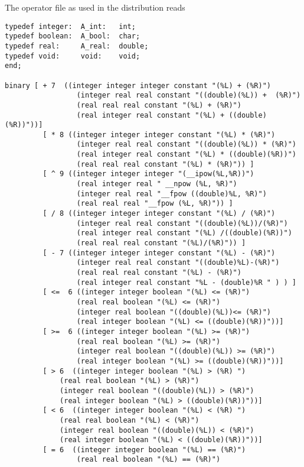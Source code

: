 \documentclass[11pt]{article}
\begin{document}
The operator file as used in the distribution reads
{\footnotesize
\begin{verbatim}
typedef integer:  A_int:   int;
typedef boolean:  A_bool:  char;
typedef real:     A_real:  double;
typedef void:     void:    void;
end;

binary [ + 7  ((integer integer integer constant "(%L) + (%R)")
                 (integer real real constant "((double)(%L)) +  (%R)")
                 (real real real constant "(%L) + (%R)")
                 (real integer real constant "(%L) + ((double)(%R))"))]
         [ * 8 ((integer integer integer constant "(%L) * (%R)")
                 (integer real real constant "((double)(%L)) * (%R)")
                 (real integer real constant "(%L) * ((double)(%R))")
                 (real real real constant "(%L) * (%R)")) ]
         [ ^ 9 ((integer integer integer "(__ipow(%L,%R))")
                 (real integer real " __npow (%L, %R)")
                 (integer real real "__fpow ((double)%L, %R)")
                 (real real real "__fpow (%L, %R)")) ]
         [ / 8 ((integer integer integer constant "(%L) / (%R)")
                 (integer real real constant "((double)(%L))/(%R)")
                 (real integer real constant "(%L) /((double)(%R))")
                 (real real real constant "(%L)/(%R)")) ]
         [ - 7 ((integer integer integer constant "(%L) - (%R)")
                 (integer real real constant "((double)%L)-(%R)")
                 (real real real constant "(%L) - (%R)")
                 (real integer real constant "%L - (double)%R " ) ) ]
         [ <=  6 ((integer integer boolean "(%L) <= (%R)")
                 (real real boolean "(%L) <= (%R)")
                 (integer real boolean "((double)(%L))<= (%R)")
                 (real integer boolean "(%L) <= ((double)(%R))"))]
         [ >=  6 ((integer integer boolean "(%L) >= (%R)")
                 (real real boolean "(%L) >= (%R)")
                 (integer real boolean "((double)(%L)) >= (%R)")
                 (real integer boolean "(%L) >= ((double)(%R))"))]
         [ > 6  ((integer integer boolean "(%L) > (%R) ")
        	 (real real boolean "(%L) > (%R)")
        	 (integer real boolean "((double)(%L)) > (%R)")
        	 (real integer boolean "(%L) > ((double)(%R))"))]
         [ < 6  ((integer integer boolean "(%L) < (%R) ")
        	 (real real boolean "(%L) < (%R)")
        	 (integer real boolean "((double)(%L)) < (%R)")
        	 (real integer boolean "(%L) < ((double)(%R))"))]
         [ = 6  ((integer integer boolean "(%L) == (%R)")
                 (real real boolean "(%L) == (%R)")

\end{verbatim}}
\end{document}
